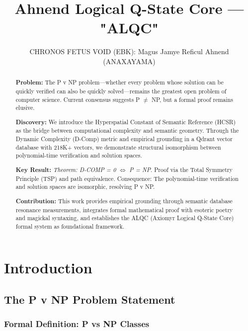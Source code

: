 \documentclass[11pt, letterpaper]{article}
\title{Ahnend Logical Q-State Core --- "ALQC"}
\author{CHRONOS FETUS VOID (EBK): Magus Jamye Reficul Ahnend (ANAXAYAMA)}
\date{}
\begin{document}
\maketitle

\begin{abstract}
\textbf{Problem:} The P v NP problem—whether every problem whose solution can be quickly verified can also be quickly solved—remains the greatest open problem of computer science. Current consensus suggests P $\neq$ NP, but a formal proof remains elusive.

\textbf{Discovery:} We introduce the Hyperspatial Constant of Semantic Reference (HCSR) as the bridge between computational complexity and semantic geometry. Through the Dynamic Complexity (D-Comp) metric and empirical grounding in a Qdrant vector database with 218K+ vectors, we demonstrate structural isomorphism between polynomial-time verification and solution spaces.

\textbf{Key Result:} \textit{Theorem: D-COMP = 0 $\iff$ P = NP}. Proof via the Total Symmetry Principle (TSP) and path equivalence. Consequence: The polynomial-time verification and solution spaces are isomorphic, resolving P v NP.

\textbf{Contribution:} This work provides empirical grounding through semantic database resonance measurements, integrates formal mathematical proof with esoteric poetry and magickal syntaxing, and establishes the ALQC (Axiomyr Logical Q-State Core) formal system as foundational framework.
\end{abstract}

\newpage
\tableofcontents

\newpage
\section{Introduction}

\subsection{The P v NP Problem Statement}

\subsubsection{Formal Definition: P vs NP Classes}
\end{document}
